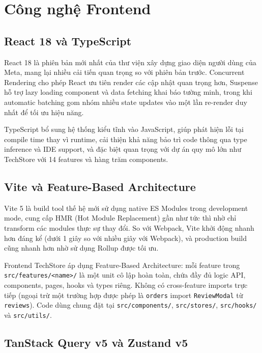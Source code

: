 \section{Công nghệ Frontend}

\subsection{React 18 và TypeScript}

React 18 là phiên bản mới nhất của thư viện xây dựng giao diện người dùng của Meta, mang lại nhiều cải tiến quan trọng so với phiên bản trước. Concurrent Rendering cho phép React ưu tiên render các cập nhật quan trọng hơn, Suspense hỗ trợ lazy loading component và data fetching khai báo tường minh, trong khi automatic batching gom nhóm nhiều state updates vào một lần re-render duy nhất để tối ưu hiệu năng.

TypeScript bổ sung hệ thống kiểu tĩnh vào JavaScript, giúp phát hiện lỗi tại compile time thay vì runtime, cải thiện khả năng bảo trì code thông qua type inference và IDE support, và đặc biệt quan trọng với dự án quy mô lớn như TechStore với 14 features và hàng trăm components.

\subsection{Vite và Feature-Based Architecture}

Vite 5 là build tool thế hệ mới sử dụng native ES Modules trong development mode, cung cấp HMR (Hot Module Replacement) gần như tức thì nhờ chỉ transform các modules thực sự thay đổi. So với Webpack, Vite khởi động nhanh hơn đáng kể (dưới 1 giây so với nhiều giây với Webpack), và production build cũng nhanh hơn nhờ sử dụng Rollup được tối ưu.

Frontend TechStore áp dụng Feature-Based Architecture: mỗi feature trong \texttt{src/features/<name>/} là một unit cô lập hoàn toàn, chứa đầy đủ logic API, components, pages, hooks và types riêng. Không có cross-feature imports trực tiếp (ngoại trừ một trường hợp được phép là \texttt{orders} import \texttt{ReviewModal} từ \texttt{reviews}). Code dùng chung đặt tại \texttt{src/components/}, \texttt{src/stores/}, \texttt{src/hooks/} và \texttt{src/utils/}.

\subsection{TanStack Query v5 và Zustand v5}

